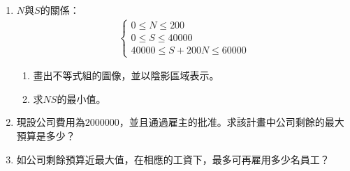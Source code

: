 \documentclass[12pt]{article}
\begin{document}
    \begin{enumerate}
        \item $N$與$S$的關係：\begin{align*}
            \begin{cases}
                0\leq N\leq 200\\
                0\leq S\leq 40000\\
                40000\leq S+200N \leq 60000
            \end{cases}
        \end{align*}
        \begin{enumerate}
            \item 畫出不等式組的圖像，並以陰影區域表示。
            \item 求$NS$的最小值。
        \end{enumerate}
        \item 現設公司費用為$2000000$，並且通過雇主的批准。求該計畫中公司剩餘的最大預算是多少？
        \item 如公司剩餘預算近最大值，在相應的工資下，最多可再雇用多少名員工？
    \end{enumerate}
\end{document}
